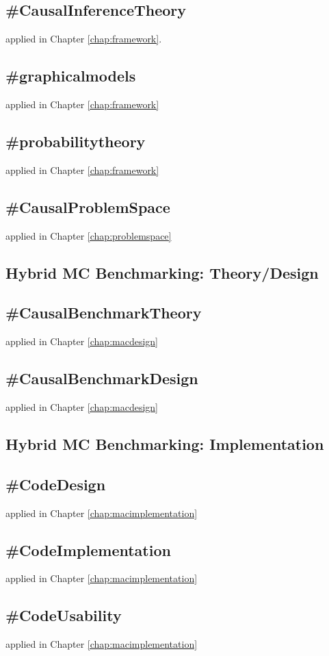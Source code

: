 \documentclass[./main.tex]{subfiles}
\begin{document}
\subsection{\textbf{\#CausalInferenceTheory}}\label{lo:CausalInferenceTheory} applied in Chapter \ref{chap:framework}.
\subsection{\textbf{\#graphicalmodels}}\label{lo:graphicalmodels} applied in Chapter \ref{chap:framework}
\subsection{\textbf{\#probabilitytheory}}\label{lo:probabilitytheory} applied in Chapter \ref{chap:framework}
\subsection{\textbf{\#CausalProblemSpace}}\label{lo:CausalProblemSpace} applied in Chapter \ref{chap:problemspace}


\subsection{Hybrid MC Benchmarking: Theory/Design}
\subsection{\textbf{\#CausalBenchmarkTheory}}\label{lo:CausalBenchmarkTheory} applied in Chapter \ref{chap:macdesign}
\subsection{\textbf{\#CausalBenchmarkDesign}}\label{lo:CausalBenchmarkDesign} applied in Chapter \ref{chap:macdesign}

\subsection{Hybrid MC Benchmarking: Implementation}
\subsection{\textbf{\#CodeDesign}}\label{lo:CodeDesign} applied in Chapter \ref{chap:macimplementation}
\subsection{\textbf{\#CodeImplementation}}\label{lo:CodeImplementation} applied in Chapter \ref{chap:macimplementation}
\subsection{\textbf{\#CodeUsability}}\label{lo:CodeUsability} applied in Chapter \ref{chap:macimplementation}
\end{document}
